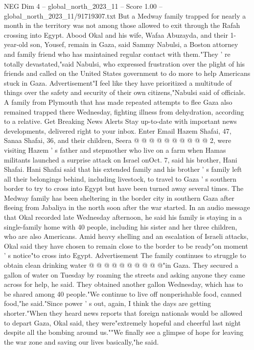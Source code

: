 \begin{textsample}{NEG Dim 4 – global\_north\_2023\_11 – Score 1.00 – global\_north\_2023\_11/91719307.txt}  \label{ex:f4_neg_186}
But a Medway family trapped for nearly a month in the territory was not among those allowed to exit through the Rafah crossing into Egypt.
Abood Okal and his wife, Wafaa Abuzayda, and their 1-year-old son, Yousef, remain in Gaza, said Sammy Nabulsi, a Boston attorney and family friend who has maintained regular contact with them."They ' re totally devastated,"said Nabulsi, who expressed frustration over the plight of his friends and called on the United States government to do more to help Americans stuck in Gaza.
Advertisement"I feel like they have prioritized a multitude of things over the safety and security of their own citizens,"Nabulsi said of officials.
A family from Plymouth that has made repeated attempts to flee Gaza also remained trapped there Wednesday, fighting illness from dehydration, according to a relative.
Get Breaking News Alerts Stay up-to-date with important news developments, delivered right to your inbox.
Enter Email Hazem Shafai, 47, Sanaa Shafai, 36, and their children, Seera @ @ @ @ @ @ @ @ @ @ 2, were visiting Hazem ' s father and stepmother who live on a farm when Hamas militants launched a surprise attack on Israel onOct. 7, said his brother, Hani Shafai.
Hani Shafai said that his extended family and his brother ' s family left all their belongings behind, including livestock, to travel to Gaza ' s southern border to try to cross into Egypt but have been turned away several times.
The Medway family has been sheltering in the border city in southern Gaza after fleeing from Jabaliya in the north soon after the war started.
In an audio message that Okal recorded late Wednesday afternoon, he said his family is staying in a single-family home with 40 people, including his sister and her three children, who are also Americans.
Amid heavy shelling and an escalation of Israeli attacks, Okal said they have chosen to remain close to the border to be ready"on moment ' s notice"to cross into Egypt.
Advertisement The family continues to struggle to obtain clean drinking water @ @ @ @ @ @ @ @ @ @"in Gaza.
They secured a gallon of water on Tuesday by roaming the streets and asking anyone they came across for help, he said.
They obtained another gallon Wednesday, which has to be shared among 40 people."We continue to live off nonperishable food, canned food,"he said."Since power ' s out, again, I think the days are getting shorter."When they heard news reports that foreign nationals would be allowed to depart Gaza, Okal said, they were"extremely hopeful and cheerful last night despite all the bombing around us.""We finally see a glimpse of hope for leaving the war zone and saving our lives basically,"he said.

\end{textsample}
